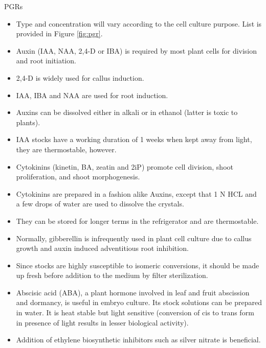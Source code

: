 \documentclass[
  ignorenonframetext,
  aspectratio=169]{beamer}
\providecommand{\tightlist}{%
  \setlength{\itemsep}{0pt}\setlength{\parskip}{0pt}}
\begin{document}
\begin{frame}{PGRs}
\protect\hypertarget{pgrs}{}
\begin{itemize}
\tightlist
\item
  Type and concentration will vary according to the cell culture
  purpose. List is provided in Figure \ref{fig:pgr}.
\item
  Auxin (IAA, NAA, 2,4-D or IBA) is required by most plant cells for
  division and root initiation.
\item
  2,4-D is widely used for callus induction.
\item
  IAA, IBA and NAA are used for root induction.
\item
  Auxins can be dissolved either in alkali or in ethanol (latter is
  toxic to plants).
\item
  IAA stocks have a working duration of 1 weeks when kept away from
  light, they are thermostable, however.
\end{itemize}
\end{frame}

\begin{frame}{}
\protect\hypertarget{section-5}{}
\begin{itemize}
\tightlist
\item
  Cytokinins (kinetin, BA, zeatin and 2iP) promote cell division, shoot
  proliferation, and shoot morphogenesis.
\item
  Cytokinins are prepared in a fashion alike Auxins, except that 1 N HCL
  and a few drops of water are used to dissolve the crystals.
\item
  They can be stored for longer terms in the refrigerator and are
  thermostable.
\item
  Normally, gibberellin is infrequently used in plant cell culture due
  to callus growth and auxin induced adventitious root inhibition.
\end{itemize}
\end{frame}

\begin{frame}{}
\protect\hypertarget{section-6}{}
\begin{itemize}
\tightlist
\item
  Since stocks are highly susceptible to isomeric conversions, it should
  be made up fresh before addition to the medium by filter
  sterilization.
\item
  Abscisic acid (ABA), a plant hormone involved in leaf and fruit
  abscission and dormancy, is useful in embryo culture. Its stock
  solutions can be prepared in water. It is heat stable but light
  sensitive (conversion of cis to trans form in presence of light
  results in lesser biological activity).
\item
  Addition of ethylene biosynthetic inhibitors such as silver nitrate is
  beneficial.
\end{itemize}
\end{frame}
\end{document}
